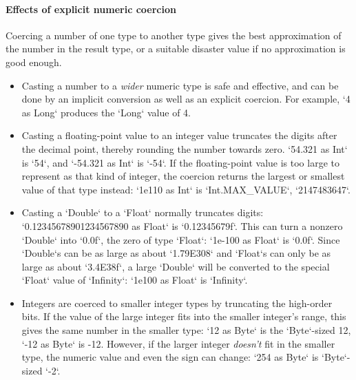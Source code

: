 \paragraph{Effects of explicit numeric coercion}
\label{sec:effects-of-explicit-numeric-coercions}

Coercing a number of one type to another type gives the best approximation of
the number in the result type, or a suitable disaster value if no
approximation is good enough.  

\begin{itemize}
\item Casting a number to a {\em wider} numeric type is safe and effective,
      and can be done by an implicit conversion as well as an explicit
      coercion.  For example, \xcd`4 as Long` produces the \xcd`Long` value of
      4. 
\item Casting a floating-point value to an integer value truncates the digits
      after the decimal point, thereby rounding the number towards zero.  
      \xcd`54.321 as Int` is \xcd`54`, and 
      \xcd`-54.321 as Int` is \xcd`-54`.
      If the floating-point value is too large to represent as that kind of
      integer, the coercion returns the largest or smallest value of that type
      instead: \xcd`1e110 as Int` is 
      \xcd`Int.MAX_VALUE`, \xcd`2147483647`. 

\item Casting a \xcd`Double` to a \xcd`Float` normally truncates digits: 
      \xcd`0.12345678901234567890 as Float` is \xcd`0.12345679f`.  This can
      turn a nonzero \xcd`Double` into \xcd`0.0f`, the zero of type
      \xcd`Float`: 
      \xcd`1e-100 as Float` is \xcd`0.0f`.  Since 
      \xcd`Double`s can be as large as about \xcd`1.79E308` and \xcd`Float`s
      can only be as large as about \xcd`3.4E38f`, a large \xcd`Double` will
      be converted to the special \xcd`Float` value of \xcd`Infinity`: 
      \xcd`1e100 as Float` is \xcd`Infinity`.
\item Integers are coerced to smaller integer types by truncating the
      high-order bits. If the value of the large integer fits into the smaller
      integer's range, this gives the same number in the smaller type: 
      \xcd`12 as Byte` is the \xcd`Byte`-sized 12, 
      \xcd`-12 as Byte` is -12. 
      However, if the larger integer {\em doesn't} fit in the smaller type,
      the numeric value and even the sign can change: \xcd`254 as Byte` is
      \xcd`Byte`-sized \xcd`-2`.  


\end{itemize}

